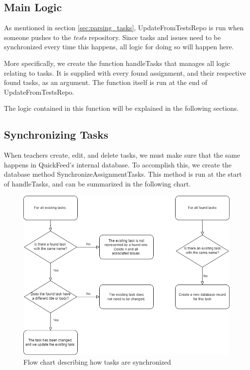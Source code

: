 \subsection{Main Logic}

As mentioned in section \ref{sec:parsing_tasks}, UpdateFromTestsRepo is run when someone pushes to the \textit{tests} repository.
Since tasks and issues need to be synchronized every time this happens, all logic for doing so will happen here.

More specifically, we create the function handleTasks that manages all logic relating to tasks.
It is supplied with every found assignment, and their respective found tasks, as an argument.
The function itself is run at the end of UpdateFromTestsRepo.



The logic contained in this function will be explained in the following sections.

\subsection{Synchronizing Tasks}

When teachers create, edit, and delete tasks, we must make sure that the same happens in QuickFeed's internal database.
To accomplish this, we create the database method SynchronizeAssignmentTasks.
This method is run at the start of handleTasks, and can be summarized in the following chart.

\begin{figure}[ht]
    \centering
    \includegraphics[width=\textwidth]{photos/synchronize-tasks-flow-chart.png}
    \caption{Flow chart describing how tasks are synchronized}
    \label{fig:synchronize-tasks-flow-chart}
\end{figure}

